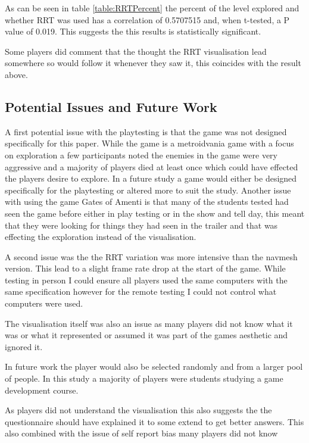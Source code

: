 \documentclass[journal]{IEEEtran}
\begin{document}
As can be seen in table \ref{table:RRTPercent} the percent of the level explored and whether RRT was used has a correlation of 0.5707515 and, when t-tested, a P value of 0.019. This suggests the this results is statistically significant.

Some players did comment that the thought the RRT visualisation lead somewhere so would follow it whenever they saw it, this coincides with the result above.

\subsection{Potential Issues and Future Work}

A first potential issue with the playtesting is that the game was not designed specifically for this paper. While the game is a metroidvania game with a focus on exploration a few participants noted the enemies in the game were very aggressive and a majority of players died at least once which could have effected the players desire to explore. In a future study a game would either be designed specifically for the playtesting or altered more to suit the study.  Another issue with using the game Gates of Amenti is that many of the students tested had seen the game before either in play testing or in the show and tell day, this meant that they were looking for things they had seen in the trailer and that was effecting the exploration instead of the visualisation.

A second issue was the the RRT variation was more intensive than the navmesh version. This lead to a slight frame rate drop at the start of the game.
  While testing in person I could ensure all players used the same computers with the same specification however for the remote testing I could not control what computers were used. 

The visualisation itself was also an issue as many players did not know what it was or what it represented or assumed it was part of the games aesthetic and ignored it.

In future work the player would also be selected randomly and from a larger pool of people. In this study a majority of players were students studying a game development course.


As players did not understand the visualisation this also suggests the the questionnaire should have explained it to some extend to get better answers. This also combined with the issue of self report bias many players did not know  
\end{document}

